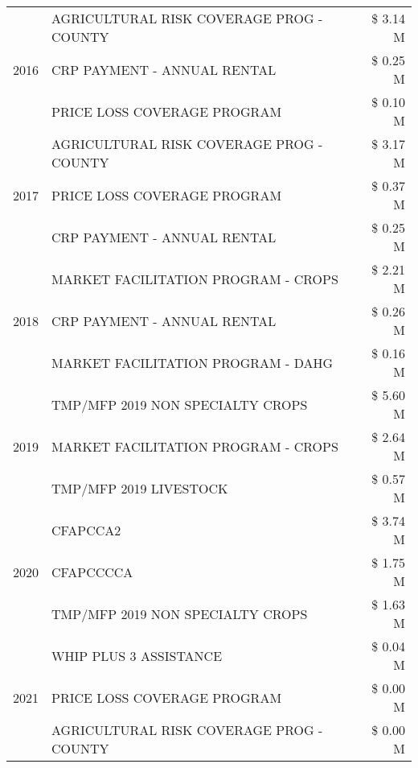 \begin{tabular}{llr}
\cline{1-3}
\multirow[t]{3}{*}{2016} & AGRICULTURAL RISK COVERAGE PROG - COUNTY & \$ 3.14 M \\
 & CRP PAYMENT - ANNUAL RENTAL & \$ 0.25 M \\
 & PRICE LOSS COVERAGE PROGRAM & \$ 0.10 M \\
\cline{1-3}
\multirow[t]{3}{*}{2017} & AGRICULTURAL RISK COVERAGE PROG - COUNTY & \$ 3.17 M \\
 & PRICE LOSS COVERAGE PROGRAM & \$ 0.37 M \\
 & CRP PAYMENT - ANNUAL RENTAL & \$ 0.25 M \\
\cline{1-3}
\multirow[t]{3}{*}{2018} & MARKET FACILITATION PROGRAM - CROPS & \$ 2.21 M \\
 & CRP PAYMENT - ANNUAL RENTAL & \$ 0.26 M \\
 & MARKET FACILITATION PROGRAM - DAHG & \$ 0.16 M \\
\cline{1-3}
\multirow[t]{3}{*}{2019} & TMP/MFP 2019 NON SPECIALTY CROPS & \$ 5.60 M \\
 & MARKET FACILITATION PROGRAM - CROPS & \$ 2.64 M \\
 & TMP/MFP 2019 LIVESTOCK & \$ 0.57 M \\
\cline{1-3}
\multirow[t]{3}{*}{2020} & CFAPCCA2 & \$ 3.74 M \\
 & CFAPCCCCA & \$ 1.75 M \\
 & TMP/MFP 2019 NON SPECIALTY CROPS & \$ 1.63 M \\
\cline{1-3}
\multirow[t]{3}{*}{2021} & WHIP PLUS 3 ASSISTANCE & \$ 0.04 M \\
 & PRICE LOSS COVERAGE PROGRAM & \$ 0.00 M \\
 & AGRICULTURAL RISK COVERAGE PROG - COUNTY & \$ 0.00 M \\
\cline{1-3}
\bottomrule
\end{tabular}
